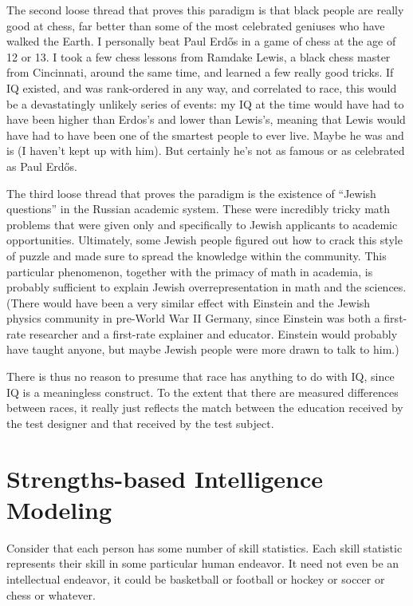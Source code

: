 \documentclass[11pt]{article}
\begin{document}
The second loose thread that proves this paradigm is that black people
are really good at chess, far better than some of the most celebrated
geniuses who have walked the Earth. I personally beat Paul Erd\H{o}s
in a game of chess at the age of 12 or 13. I took a few chess lessons
from Ramdake Lewis, a black chess master from Cincinnati, around the
same time, and learned a few really good tricks. If IQ existed, and
was rank-ordered in any way, and correlated to race, this would be a
devastatingly unlikely series of events: my IQ at the time would have
had to have been higher than Erdos's and lower than Lewis's, meaning
that Lewis would have had to have been one of the smartest people to
ever live. Maybe he was and is (I haven't kept up with him). But
certainly he's not as famous or as celebrated as Paul Erd\H{o}s.

The third loose thread that proves the paradigm is the existence of
``Jewish questions'' in the Russian academic system. These were
incredibly tricky math problems that were given only and specifically
to Jewish applicants to academic opportunities. Ultimately, some
Jewish people figured out how to crack this style of puzzle and made
sure to spread the knowledge within the community. This particular
phenomenon, together with the primacy of math in academia, is probably
sufficient to explain Jewish overrepresentation in math and the
sciences. (There would have been a very similar effect with Einstein
and the Jewish physics community in pre-World War II Germany, since
Einstein was both a first-rate researcher and a first-rate explainer
and educator. Einstein would probably have taught anyone, but maybe
Jewish people were more drawn to talk to him.)

There is thus no reason to presume that race has anything to do with
IQ, since IQ is a meaningless construct. To the extent that there are
measured differences between races, it really just reflects the match
between the education received by the test designer and that received
by the test subject.

\section{Strengths-based Intelligence Modeling}

Consider that each person has some number of skill statistics. Each
skill statistic represents their skill in some particular human
endeavor. It need not even be an intellectual endeavor, it could be
basketball or football or hockey or soccer or chess or whatever.
\end{document}
